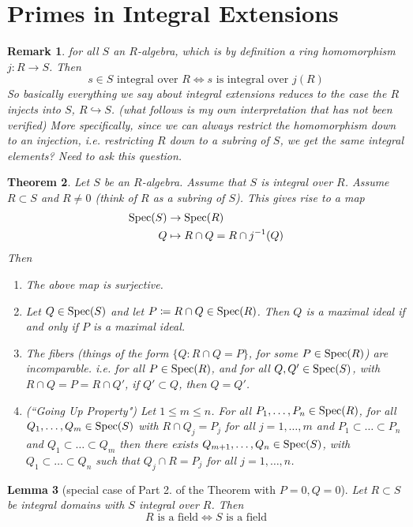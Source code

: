 \documentclass[12pt]{article}
\newcommand{\spec}{\textup{Spec}}
\newcommand{\mapp}[4]{\begin{align*}
#1 &\to #2\\
#3 & \mapsto #4
\end{align*}}
\newtheorem{theorem}{Theorem}
\newtheorem{lemma}[theorem]{Lemma}
\newtheorem{remark}[theorem]{Remark}
\theoremstyle{definition}
\begin{document}
\section*{Primes in Integral Extensions}
\begin{remark}
for all $S$ an $R$-algebra, which is by definition a ring homomorphism $j:R\rightarrow S$. Then 
\[
s\in S \text{ integral over }R \iff s \text{ is integral over }j(R)
\]
So basically everything we say about integral extensions reduces to the case the $R$ injects into $S$, $R\hookrightarrow S$. (what follows is my own interpretation that has not been verified) More specifically, since we can always restrict the homomorphism down to an injection, i.e. restricting $R$ down to a subring of $S$, we get the same integral elements? Need to ask this question.
\end{remark}
\begin{theorem}
Let $S$ be an $R$-algebra. Assume that $S$ is integral over $R$. Assume $R\subset S$ and $R\neq 0$ (think of $R$ as a subring of $S$). This gives rise to a map
\[
\mapp{\spec(S)}{\spec(R)}{Q}{R\cap Q = R \cap j^{-1}(Q)}
\]
Then
\begin{enumerate}
    \item The above map is surjective.
    \item Let $Q\in \spec(S)$ and let $P\coloneqq R\cap Q \in \spec(R)$. Then $Q$ is a maximal ideal if and only if $P$ is a maximal ideal.
    \item The fibers (things of the form $\{Q: R\cap Q =P\}$, for some $P\in \spec(R)$) are incomparable. i.e. for all $P \in \spec(R)$, and for all $Q,Q' \in \spec(S)$, with $R\cap Q =P =R\cap Q'$, if $Q'\subset Q$, then $Q=Q'$.
    \item (``Going Up Property") Let $ 1\leq m\leq n$. For all $P_1,\dots ,P_n \in \spec(R)$, for all $Q_1,\dots ,Q_m\in \spec(S)$ with $R \cap Q_j=P_j$ for all $j=1,\dots, m$ and $P_1\subset \dots \subset P_n$ and $Q_1\subset \dots \subset Q_m$ then there exists $Q_{m+1},\dots ,Q_n \in \spec(S)$, with $Q_1\subset \dots \subset Q_n$ such that $Q_j\cap R = P_j$ for all $j=1,\dots ,n$.
\end{enumerate}
\end{theorem}
\begin{lemma}[special case of Part 2. of the Theorem with $P=0,Q=0$]
Let $R\subset S$ be integral domains with $S$ integral over $R$. Then 
\[
R \text{ is a field} \iff S \text{ is a field} 
\]
\end{lemma}
\end{document}
